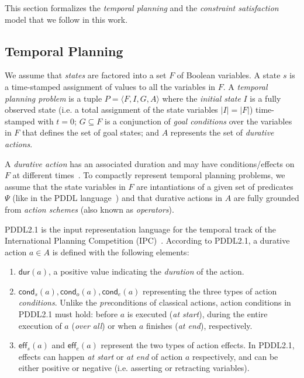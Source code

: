 \documentclass{ecai}
\newcommand{\tup}[1]{{\langle #1 \rangle}}
\newcommand{\eff}{\mathsf{eff}}    %
\newcommand{\cond}{\mathsf{cond}}  %
\newcommand{\dur}{\mathsf{dur}}    %
\begin{document}
This section formalizes the {\em temporal planning} and the {\em constraint satisfaction} model that we follow in this work.

\subsection{Temporal Planning}
\label{sec:temporalplanning}

We assume that {\em states} are factored into a set $F$ of Boolean variables. A state $s$ is a time-stamped assignment of values to all the variables in $F$. A {\em temporal planning problem} is a tuple $P=\tup{F,I,G,A}$ where the {\em initial state} $I$ is a fully observed state (i.e. a total assignment of the state variables $|I|=|F|$) time-stamped with $t=0$; $G \subseteq F$ is a conjunction of {\em goal conditions} over the variables in $F$ that defines the set of goal states; and $A$ represents the set of {\em durative actions}.

A {\em durative action} has an associated duration and may have conditions/effects on $F$ at different times~\cite{garrido2009constraint,vidal2006branching}. To compactly represent temporal planning problems, we assume that the state variables in $F$ are intantiations of a given set of predicates $\Psi$ (like in the PDDL language~\cite{younes2004ppddl1}) and that durative actions in $A$ are fully grounded from {\em action schemes} (also known as {\em operators}).

PDDL2.1 is the input representation language for the temporal track of the International Planning Competition (IPC)~\cite{fox2003pddl2,ghallab2004automated}. According to PDDL2.1, a durative action $a\in A$ is defined with the following elements:
\begin{enumerate}
\item $\dur(a)$, a positive value indicating the {\em duration} of the action.

\item $\cond_s(a), \cond_o(a), \cond_e(a)$ representing the three types of action {\em conditions}. Unlike the \emph{pre}conditions of classical actions, action conditions in PDDL2.1 must hold: before $a$ is executed ({\em at start}), during the entire execution of $a$ ({\em over all}) or when $a$ finishes ({\em at end}), respectively. 

\item $\eff_s(a)$ and $\eff_e(a)$ represent the two types of action effects. In PDDL2.1, effects can happen {\em at start} or {\em at end} of action $a$ respectively, and can be either positive or negative (i.e. asserting or retracting variables). 

\end{enumerate}
\end{document}

